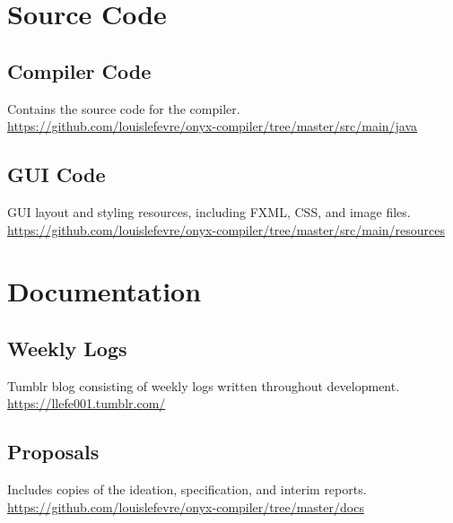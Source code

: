 \documentclass[
]{report}
\begin{document}
\printglossary

\begin{appendices}
	\chapter{Source Code}
	\section{Compiler Code}
	Contains the source code for the compiler.\\
	\url{https://github.com/louislefevre/onyx-compiler/tree/master/src/main/java}
	\section{GUI Code}
	GUI layout and styling resources, including FXML, CSS, and image files.\\
	\url{https://github.com/louislefevre/onyx-compiler/tree/master/src/main/resources}

	\chapter{Documentation}
	\section{Weekly Logs}
	Tumblr blog consisting of weekly logs written throughout development.\\
	\url{https://llefe001.tumblr.com/}
	\section{Proposals}
	Includes copies of the ideation, specification, and interim reports.\\
	\url{https://github.com/louislefevre/onyx-compiler/tree/master/docs}
	

\end{appendices}
\end{document}
